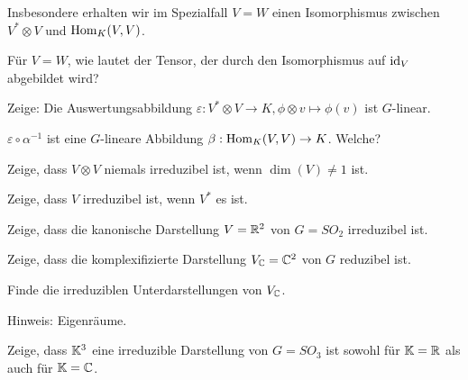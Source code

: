 \begin{sheet}
\begin{problem}
Insbesondere erhalten wir im Spezialfall $V=W$ einen Isomorphismus zwischen $V^\ast\otimes V$ und $\operatorname{Hom}_K(V,V)$.

\begin{subproblem}
Für $V=W$, wie lautet der Tensor, der durch den Isomorphismus auf $\operatorname{id}_V$ abgebildet wird?
\end{subproblem}

\begin{subproblem}
Zeige: Die Auswertungsabbildung $\varepsilon: V^\ast \otimes V \to K, \phi\otimes v\mapsto \phi(v)$ ist $G$-linear.
\end{subproblem}

\begin{subproblem}
$\varepsilon\circ\alpha^{-1}$ ist eine $G$-lineare Abbildung $\beta: \operatorname{Hom}_K(V,V) \to K$. Welche?
\end{subproblem}
\end{problem}


\begin{problem}
Zeige, dass $V\otimes V$ niemals irreduzibel ist, wenn $\dim(V) \neq 1$ ist.
\end{problem}

\begin{problem}
Zeige, dass $V$ irreduzibel ist, wenn $V^\ast$ es ist.
\end{problem}


\begin{problem}[title={Kanonische Darstellung von $SO_2$}]\label{ex:fundamentaldarstellung_von_so2}
\begin{subproblem}
Zeige, dass die kanonische Darstellung $V=\mathbb{R}^2$ von $G=SO_2$ irreduzibel ist.
\end{subproblem}
\begin{subproblem}
Zeige, dass die komplexifizierte Darstellung $V_{\mathbb{C}}=\mathbb{C}^2$ von $G$ reduzibel ist.
\end{subproblem}
\begin{subproblem}
Finde die irreduziblen Unterdarstellungen von $V_{\mathbb{C}}$.

Hinweis: Eigenräume.
\end{subproblem}
\end{problem}

\begin{problem}[title={Die kanonische Darstellung von $SO_3$ ist irreduzibel}]\label{ex:fundamentaldarstellung_von_so3}
Zeige, dass $\mathbb{K}^3$ eine irreduzible Darstellung von $G=SO_3$ ist sowohl für $\mathbb{K}=\mathbb{R}$ als auch für $\mathbb{K}=\mathbb{C}$.
\end{problem}


\end{sheet}
